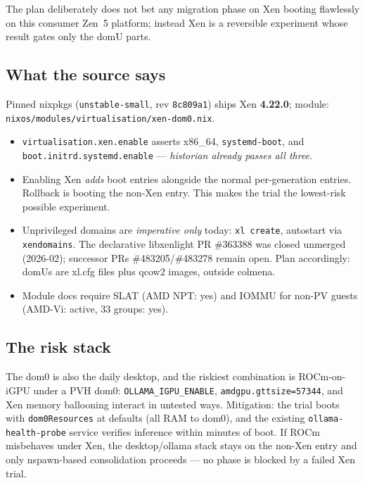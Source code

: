 \documentclass[11pt,letterpaper,headings=small]{scrartcl}
\begin{document}
The plan deliberately does not bet any migration phase on Xen booting
flawlessly on this consumer Zen~5 platform; instead Xen is a reversible
experiment whose result gates only the domU parts.

\subsection{What the source says}

Pinned nixpkgs (\texttt{unstable-small}, rev
\texttt{8c809a1}) ships Xen \textbf{4.22.0}; module:
\texttt{nixos/modules/virtualisation/xen-dom0.nix}.

\begin{itemize}
  \item \texttt{virtualisation.xen.enable} asserts x86\_64,
        \texttt{systemd-boot}, and \texttt{boot.initrd.systemd.enable} ---
        \emph{historian already passes all three}.
  \item Enabling Xen \emph{adds} boot entries alongside the normal
        per-generation entries. Rollback is booting the non-Xen entry.
        This makes the trial the lowest-risk possible experiment.
  \item Unprivileged domains are \emph{imperative only} today: \texttt{xl
        create}, autostart via \texttt{xendomains}. The declarative
        libxenlight PR \#363388 was closed unmerged (2026-02); successor
        PRs \#483205/\#483278 remain open. Plan accordingly: domUs are
        xl.cfg files plus qcow2 images, outside colmena.
  \item Module docs require SLAT (AMD NPT: yes) and IOMMU for non-PV
        guests (AMD-Vi: active, 33 groups: yes).
\end{itemize}

\subsection{The risk stack}

The dom0 is also the daily desktop, and the riskiest combination is
ROCm-on-iGPU under a PVH dom0: \texttt{OLLAMA\_IGPU\_ENABLE},
\texttt{amdgpu.gttsize=57344}, and Xen memory ballooning interact in
untested ways. Mitigation: the trial boots with
\texttt{dom0Resources} at defaults (all RAM to dom0), and the existing
\texttt{ollama-health-probe} service verifies inference within minutes of
boot. If ROCm misbehaves under Xen, the desktop/ollama stack stays on the
non-Xen entry and only nspawn-based consolidation proceeds --- no phase is
blocked by a failed Xen trial.
\end{document}
